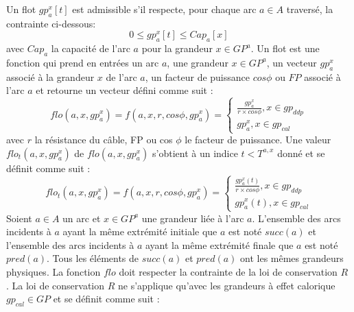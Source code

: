  \label{reglesLocales}
Un flot  $gp_{a}^{x}[t]$ est admissible s'il respecte, pour chaque arc $a \in A$ travers\'e, la contrainte ci-dessous:
\begin{equation}
	0 \le  gp_{a}^{x}[t] \le Cap_{a}[x]
\end{equation}	
avec $Cap_{a}$ la capacit\'e de l'arc $a$ pour la grandeur $x \in GP^{a}$.
\newline
Un flot est une fonction qui prend en entr\'ees 
un arc $a$, 
une grandeur $x \in GP^{a}$, 
un vecteur $gp_{a}^{x}$ associ\'e \`a la grandeur $x$ de l'arc $a$, 
un facteur de puissance $cos \phi$ ou $FP$ associ\'e  \`a l'arc $a$
et retourne un vecteur d\'efini comme suit :
\begin{equation}
	flo(a,x,gp_{a}^{x}) = f(a, x, r, cos \phi, gp_{a}^{x}) =
	\begin{cases}
		 \frac{  gp_{a}^{x} }{r \times cos \phi}, x \in gp_{ddp} \\
		 gp_{a}^{x} , x \in gp_{cal}
	\end{cases}
\end{equation}
avec $r$ la r\'esistance du c\^able, FP ou cos $\phi$ le facteur de puissance.
\newline
Une valeur $flo_{t}(a,x,gp_{a}^{x})$ de $flo(a,x,gp_{a}^{x})$ s'obtient \`a un indice $t < T^{a, x}$ donn\'e et se d\'efinit comme suit : 
\begin{equation}
	flo_t(a,x,gp_{a}^{x}) = f(a, x, r, cos \phi, gp_{a}^{x}) =
	\begin{cases}
		 \frac{  gp_{a}^{x}(t) }{r \times cos \phi}, x \in gp_{ddp} \\
		 gp_{a}^{x}(t) , x \in gp_{cal}
	\end{cases}
\end{equation}
Soient $a \in A$ un arc et $x \in GP^{a}$ une grandeur li\'ee \`a l'arc $a$.
L'ensemble des arcs incidents \`a $a$ ayant la m\^eme extr\'emit\'e initiale que $a$ est not\'e  $succ(a)$ et 
 l'ensemble des arcs incidents \`a $a$ ayant la m\^eme extr\'emit\'e finale que $a$ est not\'e $pred(a)$.
 Tous les \'el\'ements de $succ(a)$ et $pred(a)$ ont les m\^emes grandeurs physiques. 
 \newline
La fonction $flo$ doit respecter la contrainte de la loi de conservation $R$ \cite{loiDeConservation}. La loi de  conservation $R$ ne s'applique qu'avec les grandeurs \`a effet calorique $gp_{cal} \in GP$ et se d\'efinit  comme suit :
